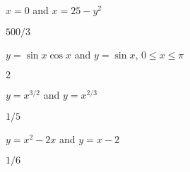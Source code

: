 \begin{exercises}
\begin{exercise} $x=0$ and $x=25-y^2$
\begin{answer} $500/3$
\end{answer}\end{exercise}

\begin{exercise} $y=\sin x\cos x$ and $y=\sin x$, $0\le x\le \pi$
\begin{answer} $2$
\end{answer}\end{exercise}

\begin{exercise} $y=x^{3/2}$ and $y=x^{2/3}$
\begin{answer} $1/5$
\end{answer}\end{exercise}

\begin{exercise} $y=x^2-2x$ and $y=x-2$
\begin{answer} $1/6$
\end{answer}\end{exercise}



\end{exercises}

